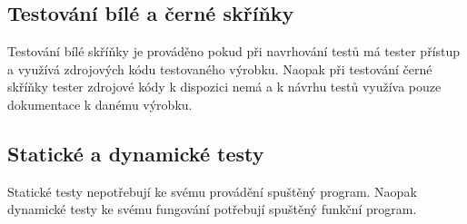 \subsection{Testování bílé a černé skříňky}
Testování bílé skříňky je prováděno pokud při navrhování testů má tester přístup a využívá zdrojových kódu testovaného výrobku. Naopak při testování černé skříňky tester zdrojové kódy k dispozici nemá a k návrhu testů využíva pouze dokumentace k danému výrobku.

\subsection{Statické a dynamické testy}
Statické testy nepotřebují ke svému provádění spuštěný program. Naopak dynamické testy ke svému fungování potřebují spuštěný funkční program.

\endinput

